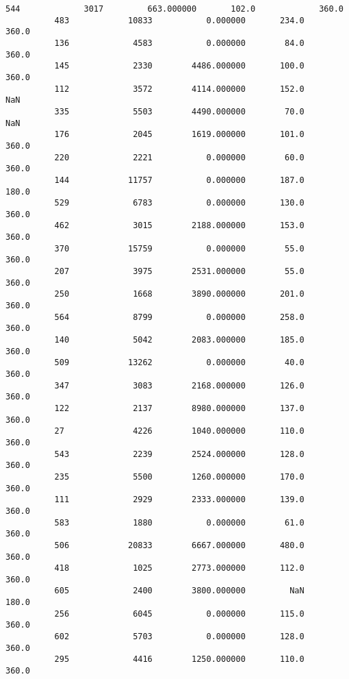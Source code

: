 \documentclass[11pt]{article}
\begin{document}
\begin{Verbatim}[commandchars=\\\{\}]
          544             3017         663.000000       102.0             360.0   
          483            10833           0.000000       234.0             360.0   
          136             4583           0.000000        84.0             360.0   
          145             2330        4486.000000       100.0             360.0   
          112             3572        4114.000000       152.0               NaN   
          335             5503        4490.000000        70.0               NaN   
          176             2045        1619.000000       101.0             360.0   
          220             2221           0.000000        60.0             360.0   
          144            11757           0.000000       187.0             180.0   
          529             6783           0.000000       130.0             360.0   
          462             3015        2188.000000       153.0             360.0   
          370            15759           0.000000        55.0             360.0   
          207             3975        2531.000000        55.0             360.0   
          250             1668        3890.000000       201.0             360.0   
          564             8799           0.000000       258.0             360.0   
          140             5042        2083.000000       185.0             360.0   
          509            13262           0.000000        40.0             360.0   
          347             3083        2168.000000       126.0             360.0   
          122             2137        8980.000000       137.0             360.0   
          27              4226        1040.000000       110.0             360.0   
          543             2239        2524.000000       128.0             360.0   
          235             5500        1260.000000       170.0             360.0   
          111             2929        2333.000000       139.0             360.0   
          583             1880           0.000000        61.0             360.0   
          506            20833        6667.000000       480.0             360.0   
          418             1025        2773.000000       112.0             360.0   
          605             2400        3800.000000         NaN             180.0   
          256             6045           0.000000       115.0             360.0   
          602             5703           0.000000       128.0             360.0   
          295             4416        1250.000000       110.0             360.0   
          

\end{Verbatim}
\end{document}
